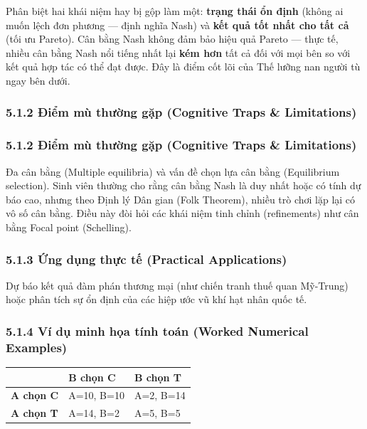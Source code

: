 \documentclass[
]{article}
\newcounter{none} %
\begin{document}
Phân biệt hai khái niệm hay bị gộp làm một: \textbf{trạng thái ổn định}
(không ai muốn lệch đơn phương --- định nghĩa Nash) và \textbf{kết quả
tốt nhất cho tất cả} (tối ưu Pareto). Cân bằng Nash không đảm bảo hiệu
quả Pareto --- thực tế, nhiều cân bằng Nash nổi tiếng nhất lại
\textbf{kém hơn} tất cả đối với mọi bên so với kết quả hợp tác có thể
đạt được. Đây là điểm cốt lõi của Thế lưỡng nan người tù ngay bên dưới.

\subsubsection{5.1.2 Điểm mù thường gặp (Cognitive Traps \&
Limitations)}\label{ux111iux1ec3m-muxf9-thux1b0ux1eddng-gux1eb7p-cognitive-traps-limitations-1}

\subsubsection{5.1.2 Điểm mù thường gặp (Cognitive Traps \&
Limitations)}\label{ux111iux1ec3m-muxf9-thux1b0ux1eddng-gux1eb7p-cognitive-traps-limitations-2}

Đa cân bằng (Multiple equilibria) và vấn đề chọn lựa cân bằng
(Equilibrium selection). Sinh viên thường cho rằng cân bằng Nash là duy
nhất hoặc có tính dự báo cao, nhưng theo Định lý Dân gian (Folk
Theorem), nhiều trò chơi lặp lại có vô số cân bằng. Điều này đòi hỏi các
khái niệm tinh chỉnh (refinements) như cân bằng Focal point (Schelling).

\subsubsection{5.1.3 Ứng dụng thực tế (Practical
Applications)}\label{ux1ee9ng-dux1ee5ng-thux1ef1c-tux1ebf-practical-applications-2}

Dự báo kết quả đàm phán thương mại (như chiến tranh thuế quan Mỹ-Trung)
hoặc phân tích sự ổn định của các hiệp ước vũ khí hạt nhân quốc tế.

\subsubsection{5.1.4 Ví dụ minh họa tính toán (Worked Numerical
Examples)}\label{vuxed-dux1ee5-minh-hux1ecda-tuxednh-touxe1n-worked-numerical-examples-1}

{\def\LTcaptype{none} %
\begin{longtable}[]{@{}lll@{}}
\toprule\noalign{}
& \textbf{B chọn C} & \textbf{B chọn T} \\
\midrule\noalign{}
\endhead
\bottomrule\noalign{}
\endlastfoot
\textbf{A chọn C} & A=10, B=10 & A=2, B=14 \\
\textbf{A chọn T} & A=14, B=2 & A=5, B=5 \\
\end{longtable}
}
\end{document}
